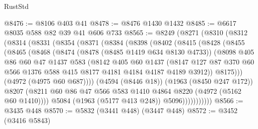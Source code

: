 \begin{lexlean}{RustStd}
\begin{coremodule}
@8476 := @8106 @403 @41
@8478 := @8476 @1430 @1432
@8485 := @6617 @8035 @588 @82 @39 @41 @606 @733
@8565 := @8249
    (@8271
      (@8310
        (@8312
          (@8314
            (@8331
              (@8354
                (@8371
                  (@8384
                    (@8398
                      (@8402
                        (@8415
                          (@8428
                            (@8455
                              (@8465
                                (@8468
                                  (@8474
                                    (@8478 (@8485 @1419 @634 @8130 @4733))
                                    (@8098
                                      @405
                                      @86
                                      @60
                                      @47
                                      @1437
                                      @583
                                      (@8142
                                        @405
                                        @60
                                        @1437
                                        (@8147
                                          @127
                                          @87
                                          @370
                                          @60
                                          @566
                                          @1376
                                          @588
                                          @415
                                          @8177
                                          @4181
                                          @4184
                                          @4187
                                          @4189
                                          @3912))
                                      @8175)))
                                (@4972 (@4975 @60 @687))))
                            (@4594 (@8446 @18))
                            (@1963 (@8450 @247 @172))
                            @8207
                            (@8211
                              @60
                              @86
                              @47
                              @566
                              @583
                              @1410
                              @4864
                              @8220
                              (@4972 (@5162 @60 @1410))))
                          @5084
                          (@1963 (@5177 @413 @248))
                          @5096)))))))))))
@8566 := @3435 @448
@8570 := @5832 (@3441 @448) (@3447 @448)
@8572 := @3452 (@3416 @5843)

\end{coremodule}
\end{lexlean}
